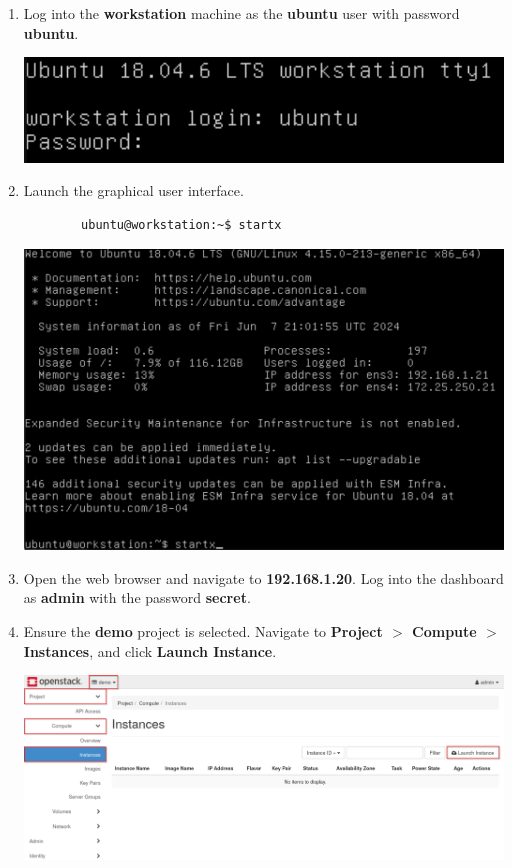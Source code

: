 \documentclass[letterpaper, 12pt]{article}
\begin{document}
\begin{enumerate}
    \item Log into the \textbf{workstation} machine as the \textbf{ubuntu} user with password \textbf{ubuntu}.

    \begin{center}
        \includegraphics[width=\linewidth]{images/part1/step1.png}
    \end{center}

    \item Launch the graphical user interface.
    \begin{lstlisting}
        ubuntu@workstation:~$ startx
    \end{lstlisting}

    \begin{center}
        \includegraphics[width=\linewidth]{images/part1/step2.png}
    \end{center}

    \item Open the web browser and navigate to \textbf{192.168.1.20}. Log into the dashboard as \textbf{admin} with the
    password \textbf{secret}.

    \item Ensure the \textbf{demo} project is selected. Navigate to \textbf{Project $>$ Compute $>$ Instances}, and
    click \textbf{Launch Instance}.

    \begin{center}
        \includegraphics[width=\linewidth]{images/part1/step4.png}
    \end{center}


\end{enumerate}
\end{document}
